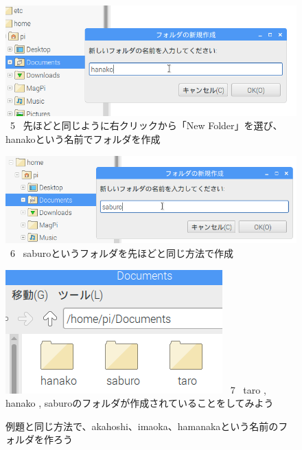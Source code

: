 \documentclass[a4paper,12pt]{jarticle}
\begin{document}
\begin{figure}
  \\
  \vspace{10mm}
  \centering
  \begin{minipage}{0.9\textwidth}
  \includegraphics[width=\linewidth]{textbook-img041.png}
    \ 5
    \ 先ほどと同じように右クリックから「New Folder」を選び、hanakoという名前でフォルダを作成
  \end{minipage}
  \vfill

  \centering
  \begin{minipage}{0.9\textwidth}
  \includegraphics[width=\linewidth]{textbook-img042.png}
    \ 6
    \ saburoというフォルダを先ほどと同じ方法で作成
  \end{minipage}
  \vfill

  \centering
  \begin{minipage}{0.9\textwidth}
  \includegraphics[width=\linewidth]{textbook-img043.png}
    \ 7 \ taro , hanako ,
    saburoのフォルダが作成されていることをしてみよう
  \end{minipage}
  \vspace{10mm}
  \flushleft
  \theQuestion\label{Q:hasAnswer02-1}

  例題と同じ方法で、akahoshi、imaoka、hamanakaという名前のフォルダを作ろう

\end{figure}
\clearpage
{}
\end{document}
